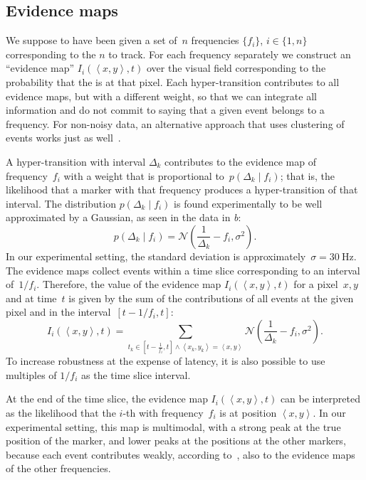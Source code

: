 \subsection{Evidence maps}

We suppose to have been given a set of~$n$ frequencies $\{f_{i}\}$,
$i\in\{1,n\}$ corresponding to the $n$ \ALMs to track. For each
frequency separately we construct an ``evidence map'' $I_{i}(\left\langle x,y\right\rangle ,t)$
over the visual field corresponding to the probability that the \ALM
is at that pixel. Each hyper-transition contributes to all evidence
maps, but with a different weight, so that we can integrate all information
and do not commit to saying that a given event belongs to a frequency.
For non-noisy data, an alternative approach that uses clustering of
events works just as well~\cite{Matthias}.

A hyper-transition with interval $\Delta_{k}$ contributes to the
evidence map of frequency~$f_{i}$ with a weight that is proportional
to~$p(\Delta_{k}\mid f_{i})$; that is, the likelihood that a marker
\ALM with that frequency produces a hyper-transition of that interval.
The distribution $p(\Delta_{k}\mid f_{i})$ is found experimentally
to be well approximated by a Gaussian, as seen in the data in \emph{b}:
\begin{equation}
p(\Delta_{k}\mid f_{i})=\mathcal{N}\left(\frac{1}{\Delta_{k}}-f_{i},\sigma^{2}\right).\label{eq:lik_delta}
\end{equation}
In our experimental setting, the standard deviation is approximately~$\sigma=30\ \mbox{Hz}$.
The evidence maps collect events within a time slice corresponding
to an interval of~$1/f_{i}$. Therefore, the value of the evidence
map $I_{i}(\left\langle x,y\right\rangle ,t)$ for a pixel~$x,y$
and at time~$t$ is given by the sum of the contributions of all
events at the given pixel and in the interval~$\left[t-1/f_{i},t\right]$:
\[
I_{i}(\left\langle x,y\right\rangle ,t)=\sum_{t_{k}\in\left[t-\frac{1}{f_{i}},t\right]\wedge\left\langle x_{k},y_{k}\right\rangle =\left\langle x,y\right\rangle }\mathcal{N}\left(\frac{1}{\Delta_{k}}-f_{i},\sigma^{2}\right).
\]
To increase robustness at the expense of latency, it is also possible
to use multiples of $1/f_{i}$ as the time slice interval.

At the end of the time slice, the evidence map $I_{i}(\left\langle x,y\right\rangle ,t)$
can be interpreted as the likelihood that the $i$-th \ALM with frequency~$f_{i}$
is at position $\left\langle x,y\right\rangle $. In our experimental
setting, this map is multimodal, with a strong peak at the true position
of the marker, and lower peaks at the positions at the other markers,
because each event contributes weakly, according to~,
also to the evidence maps of the other frequencies. 

